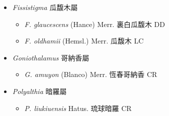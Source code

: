 
  \begin{itemize}
 \item[] \textit{Fissistigma} 瓜馥木屬
                                
  \begin{itemize}
        \item[] \textit{F. glaucescens} (Hance) Merr.  裏白瓜馥木   DD
        \item[] \textit{F. oldhamii} (Hemsl.) Merr.  瓜馥木   LC
  \end{itemize}
 \item[] \textit{Goniothalamus} 哥納香屬
                                
  \begin{itemize}
        \item[] \textit{G. amuyon} (Blanco) Merr.  恆春哥納香   CR
  \end{itemize}
 \item[] \textit{Polyalthia} 暗羅屬
                                
  \begin{itemize}
        \item[] \textit{P. liukiuensis} Hatus.  琉球暗羅   CR
  \end{itemize}
  \end{itemize}

